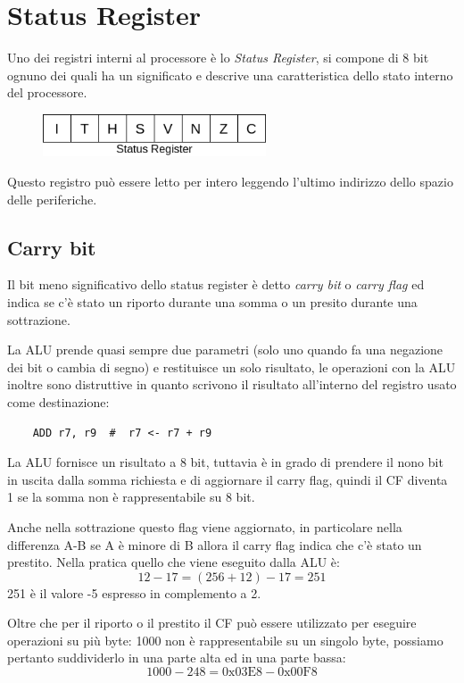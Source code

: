 \section{Status Register}
Uno dei registri interni al processore è lo \emph{Status Register}, si compone di 8 bit ognuno dei quali ha un significato e descrive una caratteristica dello stato interno del processore.

\begin{figure}[H]
    \centering
    \includegraphics[width=250px]{images/4_Status_register/status_register.png}
\end{figure}

Questo registro può essere letto per intero leggendo l'ultimo indirizzo dello spazio delle periferiche.

\subsection{Carry bit}
Il bit meno significativo dello status register è detto \emph{carry bit} o \emph{carry flag} ed indica se c'è stato un riporto durante una somma o un presito durante una sottrazione.

La ALU prende quasi sempre due parametri (solo uno quando fa una negazione dei bit o cambia di segno) e restituisce un solo risultato, le operazioni con la ALU inoltre sono distruttive in quanto scrivono il risultato all'interno del registro usato come destinazione:

\begin{verbatim}
    ADD r7, r9  #  r7 <- r7 + r9
\end{verbatim}

La ALU fornisce un risultato a 8 bit, tuttavia è in grado di prendere il nono bit in uscita dalla somma richiesta e di aggiornare il carry flag, quindi il CF diventa 1 se la somma non è rappresentabile su 8 bit.

Anche nella sottrazione questo flag viene aggiornato, in particolare nella differenza A-B se A è minore di B allora il carry flag indica che c'è stato un prestito. Nella pratica quello che viene eseguito dalla ALU è:
$$ 12 - 17 = (256 + 12) - 17 = 251 $$
251 è il valore -5 espresso in complemento a 2.

Oltre che per il riporto o il prestito il CF può essere utilizzato per eseguire operazioni su più byte: 1000 non è rappresentabile su un singolo byte, possiamo pertanto suddividerlo in una parte alta ed in una parte bassa:
$$ 1000 - 248  = \text{0x03E8} - \text{0x00F8} $$

